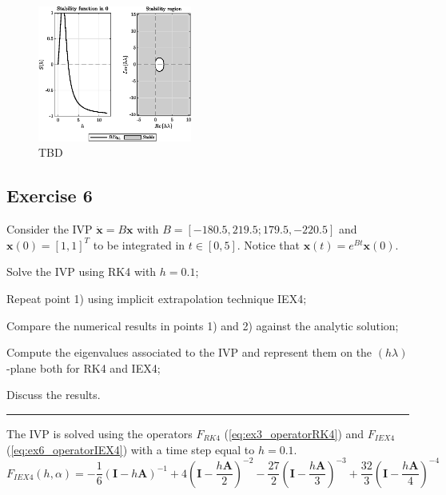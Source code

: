 \documentclass[11pt,a4paper,oneside]{article}
\renewcommand{\vec}[1]{\mathbf{#1}}
\begin{document}
\begin{figure}[htb]
    \centering
    \includegraphics*[width=0.45\textwidth, keepaspectratio]{ex5_BI2_0.1.eps}
    \caption[]{\label{fig:ex5_BI2-01} TBD}
\end{figure}


\clearpage
\subsection*{Exercise 6}

Consider the IVP $\dot{\vec x} = B \vec x$ with $B =[-180.5, 219.5; 179.5, -220.5]$ and $\vec{x}(0)=[1, 1]^T$ to be integrated in $t\in[0, 5]$. Notice that $\vec{x}(t)=e^{Bt}\vec{x}(0)$.
\begin{enumerate*}[label=\arabic*)]
    \item Solve the IVP using RK4 with $h=0.1$;
    \item Repeat point 1) using implicit extrapolation technique IEX4;
    \item Compare the numerical results in points 1) and 2) against the analytic solution;
    \item Compute the eigenvalues associated to the IVP and represent them on the $(h\lambda)$-plane both for RK4 and IEX4;
    \item Discuss the results.
\end{enumerate*}

\medskip \hrule \medskip

The IVP is solved using the operators $F_{RK4}$ (\cref{eq:ex3_operatorRK4}) and $F_{IEX4}$ (\cref{eq:ex6_operatorIEX4}) with a time step equal to $h=0.1$.
\begin{equation}
    F_{IEX4}(h,\alpha) =  -\frac{1}{6} \left(\vec{I} - h\vec{A}\right)^{-1} + 4 \left(\vec{I} - \frac{h\vec{A}}{2}\right)^{-2} -\frac{27}{2} \left(\vec{I} - \frac{h\vec{A}}{3}\right)^{-3} + \frac{32}{3} \left(\vec{I} - \frac{h\vec{A}}{4}\right)^{-4}
    \label{eq:ex6_operatorIEX4}
\end{equation}
\end{document}
